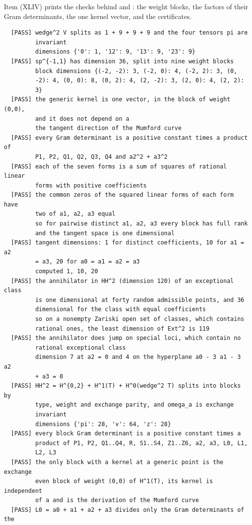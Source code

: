 Item (XLIV) prints the checks behind  and
: the weight blocks, the factors of their Gram
determinants, the one kernel vector, and the certificates.

\begin{small}
\begin{verbatim}
  [PASS] wedge^2 V splits as 1 + 9 + 9 + 9 and the four tensors pi are
         invariant
         dimensions {'0': 1, '12': 9, '13': 9, '23': 9}
  [PASS] sp^{-1,1} has dimension 36, split into nine weight blocks
         block dimensions {(-2, -2): 3, (-2, 0): 4, (-2, 2): 3, (0,
         -2): 4, (0, 0): 8, (0, 2): 4, (2, -2): 3, (2, 0): 4, (2, 2):
         3}
  [PASS] the generic kernel is one vector, in the block of weight (0,0),
         and it does not depend on a
         the tangent direction of the Mumford curve
  [PASS] every Gram determinant is a positive constant times a product of
         P1, P2, Q1, Q2, Q3, Q4 and a2^2 + a3^2
  [PASS] each of the seven forms is a sum of squares of rational linear
         forms with positive coefficients
  [PASS] the common zeros of the squared linear forms of each form have
         two of a1, a2, a3 equal
         so for pairwise distinct a1, a2, a3 every block has full rank
         and the tangent space is one dimensional
  [PASS] tangent dimensions: 1 for distinct coefficients, 10 for a1 = a2
         = a3, 20 for a0 = a1 = a2 = a3
         computed 1, 10, 20
  [PASS] the annihilator in HH^2 (dimension 120) of an exceptional class
         is one dimensional at forty random admissible points, and 36
         dimensional for the class with equal coefficients
         so on a nonempty Zariski open set of classes, which contains
         rational ones, the least dimension of Ext^2 is 119
  [PASS] the annihilator does jump on special loci, which contain no
         rational exceptional class
         dimension 7 at a2 = 0 and 4 on the hyperplane a0 - 3 a1 - 3 a2
         + a3 = 0
  [PASS] HH^2 = H^{0,2} + H^1(T) + H^0(wedge^2 T) splits into blocks by
         type, weight and exchange parity, and omega_a is exchange
         invariant
         dimensions {'pi': 28, 'v': 64, 'z': 28}
  [PASS] every block Gram determinant is a positive constant times a
         product of P1, P2, Q1..Q4, R, S1..S4, Z1..Z6, a2, a3, L0, L1,
         L2, L3
  [PASS] the only block with a kernel at a generic point is the exchange
         even block of weight (0,0) of H^1(T), its kernel is independent
         of a and is the derivation of the Mumford curve
  [PASS] L0 = a0 + a1 + a2 + a3 divides only the Gram determinants of the

\end{verbatim}
\end{small}
